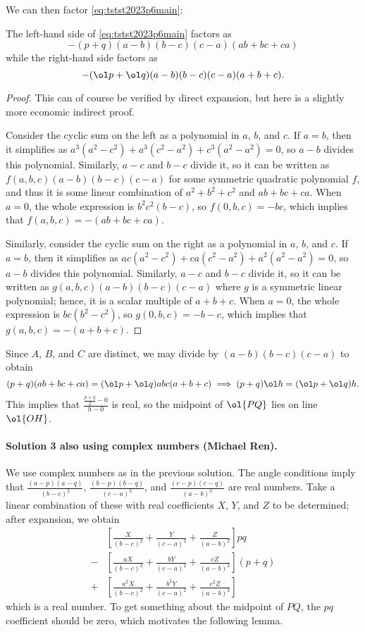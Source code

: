 \documentclass[11pt]{scrartcl}
\begin{document}
We can then factor \eqref{eq:tstst2023p6main}:
\begin{claim*}
  The left-hand side of \eqref{eq:tstst2023p6main} factors as
  \[ -(p+q)(a-b)(b-c)(c-a)(ab+bc+ca) \]
  while the right-hand side factors as
  \[ -(\ol p + \ol q)(a-b)(b-c)(c-a)(a+b+c). \]
\end{claim*}
\begin{proof}
  This can of course be verified by direct expansion, but here is a slightly
  more economic indirect proof.

  Consider the cyclic sum on the left as a polynomial in $a$, $b$, and $c$.
  If $a=b$, then it simplifies as $a^3(a^2-c^2)+a^3(c^2-a^2)+c^3(a^2-a^2)=0$,
  so $a-b$ divides this polynomial.
  Similarly, $a-c$ and $b-c$ divide it, so it can be written as
  $f(a,b,c)(a-b)(b-c)(c-a)$ for some symmetric quadratic polynomial $f$,
  and thus it is some linear combination of $a^2+b^2+c^2$ and $ab+bc+ca$.
  When $a=0$, the whole expression is $b^2c^2(b-c)$, so $f(0,b,c)=-bc$, which
  implies that $f(a,b,c)=-(ab+bc+ca)$.

  Similarly, consider the cyclic sum on the right as a polynomial in $a$, $b$, and $c$.
  If $a=b$, then it simplifies as $ac(a^2-c^2)+ca(c^2-a^2)+a^2(a^2-a^2)=0$,
  so $a-b$ divides this polynomial.
  Similarly, $a-c$ and $b-c$ divide it, so it can be written as
  $g(a,b,c)(a-b)(b-c)(c-a)$ where $g$ is a symmetric linear polynomial;
  hence, it is a scalar multiple of $a+b+c$.
  When $a=0$, the whole expression is $bc(b^2-c^2)$, so $g(0,b,c)=-b-c$,
  which implies that $g(a,b,c)=-(a+b+c)$.
\end{proof}

Since $A$, $B$, and $C$ are distinct,
we may divide by $(a-b)(b-c)(c-a)$ to obtain
\[
  (p+q)(ab+bc+ca)=(\ol p+\ol q)abc(a+b+c) \implies
  (p+q)\ol h=(\ol p+\ol q)h.
\]
This implies that $\frac{\frac{p+q}2-0}{h-0}$ is real,
so the midpoint of $\ol{PQ}$ lies on line $\ol{OH}$.

\paragraph{Solution 3 also using complex numbers (Michael Ren).}
We use complex numbers as in the previous solution.
The angle conditions imply that
$\frac{(a-p)(a-q)}{(b-c)^2}$, $\frac{(b-p)(b-q)}{(c-a)^2}$,
and $\frac{(c-p)(c-q)}{(a-b)^2}$ are real numbers.
Take a linear combination of these with real coefficients
$X$, $Y$, and $Z$ to be determined; after expansion, we obtain
\begin{align*}
  &\left[\frac{X}{(b-c)^2}+\frac{Y}{(c-a)^2}+\frac{Z}{(a-b)^2}\right]pq \\
  - &\left[\frac{aX}{(b-c)^2}+\frac{bY}{(c-a)^2}+\frac{cZ}{(a-b)^2}\right](p+q)
  \\
  + &\left[\frac{a^2X}{(b-c)^2}+\frac{b^2Y}{(c-a)^2}+\frac{c^2Z}{(a-b)^2}\right]
\end{align*}
which is a real number. To get something about the midpoint of $PQ$, the $pq$
coefficient should be zero, which motivates the following lemma.
\end{document}
